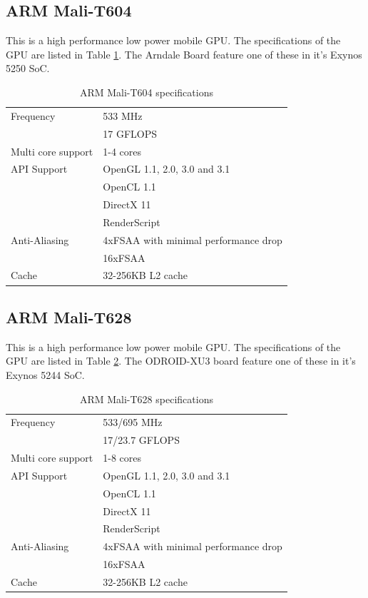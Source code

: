 \subsection{ARM Mali-T604}
This is a high performance low power mobile GPU.
The specifications of the GPU are listed in Table \ref{T604}.
The Arndale Board feature one of these in it's Exynos 5250 SoC.
\begin{table}[H]
  \centering
  \begin{tabular}{ll}
    \toprule
    Frequency         & 533 MHz\\
                      & 17 GFLOPS  \\
    \midrule
    Multi core support & 1-4 cores  \\
    \midrule
    API Support       & OpenGL 1.1, 2.0, 3.0 and 3.1  \\
                      & OpenCL 1.1  \\
                      & DirectX 11  \\
                      & RenderScript \\
    \midrule
    Anti-Aliasing     & 4xFSAA with minimal performance drop  \\
                      & 16xFSAA  \\
    \midrule
    Cache             & 32-256KB L2 cache \\
    \bottomrule
  \end{tabular}
  \caption{ARM Mali-T604 specifications\label{T604}}
\end{table}

\subsection{ARM Mali-T628}
This is a high performance low power mobile GPU.
The specifications of the GPU are listed in Table \ref{T628}.
The ODROID-XU3 board feature one of these in it's Exynos 5244 SoC.
\begin{table}[H]
  \centering
  \begin{tabular}{ll}
    \toprule
    Frequency         & 533/695 MHz \\
                      & 17/23.7 GFLOPS \\
    \midrule
    Multi core support & 1-8 cores  \\
    \midrule
    API Support       & OpenGL 1.1, 2.0, 3.0 and 3.1  \\
                      & OpenCL 1.1  \\
                      & DirectX 11  \\
                      & RenderScript \\
    \midrule
    Anti-Aliasing     & 4xFSAA with minimal performance drop  \\
                      & 16xFSAA  \\
    \midrule
    Cache             & 32-256KB L2 cache \\
    \bottomrule
  \end{tabular}
  \caption{ARM Mali-T628 specifications\label{T628}}
\end{table}

